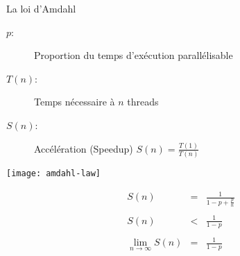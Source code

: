 
\begingroup

\begin{frame}{La loi d'Amdahl}

  \begin{description}
  \item[$p$: ] Proportion du temps d'exécution parallélisable 
  \item[$T(n)$: ] Temps nécessaire à $n$ threads
  \item[$S(n)$: ] Accélération (Speedup) $S(n) = \frac{T(1)}{T(n)}$ 
  \end{description}

  \pause

  \hspace{\fill}
  \begin{minipage}{.6\textwidth}
    \texttt{[image: amdahl-law]}
  \end{minipage}
  \hspace{\fill}
  \begin{minipage}{.35\textwidth}
    \vspace{-1cm}
    $$
    \begin{array}{rcl}
      \displaystyle S(n) &\displaystyle =& \displaystyle \frac{1}{1-p + \frac{p}{n}}\\
      \\
      \displaystyle S(n) &\displaystyle <& \displaystyle\frac{1}{1-p}\\
      \\
      \displaystyle \lim_{n\rightarrow \infty} S(n) &\displaystyle =& \displaystyle \frac{1}{1-p}
    \end{array}
    $$
  \end{minipage}
  \hspace{\fill}

\end{frame}

\endgroup
\endinput
